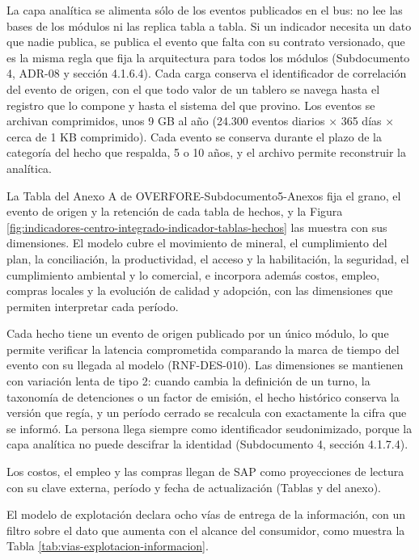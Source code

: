\documentclass[subdoc]{../../comun/overfore}
\begin{document}
La capa analítica se alimenta sólo de los eventos publicados en el bus: no lee las bases de los módulos ni las replica tabla a tabla. Si un indicador necesita un dato que nadie publica, se publica el evento que falta con su contrato versionado, que es la misma regla que fija la arquitectura para todos los módulos (Subdocumento 4, ADR-08 y sección 4.1.6.4). Cada carga conserva el identificador de correlación del evento de origen, con el que todo valor de un tablero se navega hasta el registro que lo compone y hasta el sistema del que provino. Los eventos se archivan comprimidos, unos 9 GB al año (24.300 eventos diarios × 365 días × cerca de 1 KB comprimido). Cada evento se conserva durante el plazo de la categoría del hecho que respalda, 5 o 10 años, y el archivo permite reconstruir la analítica.

La Tabla  del Anexo A de OVERFORE-Subdocumento5-Anexos fija el grano, el evento de origen y la retención de cada tabla de hechos, y la Figura \ref{fig:indicadores-centro-integrado-indicador-tablas-hechos} las muestra con sus dimensiones. El modelo cubre el movimiento de mineral, el cumplimiento del plan, la conciliación, la productividad, el acceso y la habilitación, la seguridad, el cumplimiento ambiental y lo comercial, e incorpora además costos, empleo, compras locales y la evolución de calidad y adopción, con las dimensiones que permiten interpretar cada período.

Cada hecho tiene un evento de origen publicado por un único módulo, lo que permite verificar la latencia comprometida comparando la marca de tiempo del evento con su llegada al modelo (RNF-DES-010). Las dimensiones se mantienen con variación lenta de tipo 2: cuando cambia la definición de un turno, la taxonomía de detenciones o un factor de emisión, el hecho histórico conserva la versión que regía, y un período cerrado se recalcula con exactamente la cifra que se informó. La persona llega siempre como identificador seudonimizado, porque la capa analítica no puede descifrar la identidad (Subdocumento 4, sección 4.1.7.4).

Los costos, el empleo y las compras llegan de SAP como proyecciones de lectura con su clave externa, período y fecha de actualización (Tablas  y  del anexo).

El modelo de explotación declara ocho vías de entrega de la información, con un filtro sobre el dato que aumenta con el alcance del consumidor, como muestra la Tabla \ref{tab:vias-explotacion-informacion}.
\end{document}
